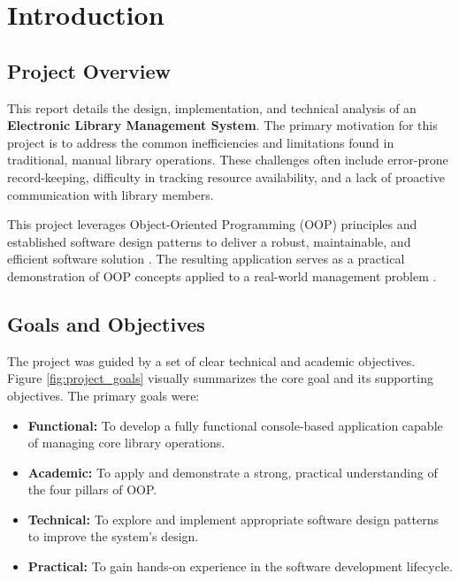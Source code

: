 \section{Introduction}
\label{sec:introduction}

\subsection{Project Overview}
This report details the design, implementation, and technical analysis of an \textbf{Electronic Library Management System}. The primary motivation for this project is to address the common inefficiencies and limitations found in traditional, manual library operations. These challenges often include error-prone record-keeping, difficulty in tracking resource availability, and a lack of proactive communication with library members.

This project leverages Object-Oriented Programming (OOP) principles and established software design patterns to deliver a robust, maintainable, and efficient software solution \cite{Booch2007}. The resulting application serves as a practical demonstration of OOP concepts applied to a real-world management problem \cite{GoF1994}.

\subsection{Goals and Objectives}
The project was guided by a set of clear technical and academic objectives. Figure \ref{fig:project_goals} visually summarizes the core goal and its supporting objectives. The primary goals were:

\begin{itemize}
    \item \textbf{Functional:} To develop a fully functional console-based application capable of managing core library operations.
    \item \textbf{Academic:} To apply and demonstrate a strong, practical understanding of the four pillars of OOP.
    \item \textbf{Technical:} To explore and implement appropriate software design patterns to improve the system's design.
    \item \textbf{Practical:} To gain hands-on experience in the software development lifecycle.
\end{itemize}

